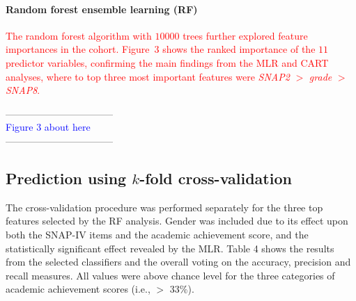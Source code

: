 \documentclass[10pt,letterpaper]{article}
\begin{document}
{{\paragraph{Random forest ensemble learning (RF)}
\textcolor{red}{The random forest algorithm with $10000$ trees further explored feature importances in the cohort. 
Figure~3 shows the ranked importance of the $11$ predictor variables, 
confirming the main findings from the MLR and CART analyses, where to top three most important features were {\it SNAP2}  $>$ {\it grade}  $>$  {\it SNAP8}.}  \\

\vspace{3mm}
 
\begin{center}
---------------------------------\\
 
\textcolor{blue}{Figure 3 about here} \\
 
---------------------------------\\
\end{center}
  
\vspace{3mm}
  

\subsection*{Prediction using $k$-fold cross-validation}

The cross-validation procedure was performed separately for the three top features selected by the RF analysis. Gender was included due to its effect upon both the SNAP-IV items and the academic achievement score, and the statistically significant effect revealed by the MLR.  
Table 4 shows the results from the selected classifiers and the overall voting on the accuracy, precision and recall measures. All values were above chance level for the three categories of academic achievement scores (i.e., $>$ 33\%). 



}}
\end{document}
